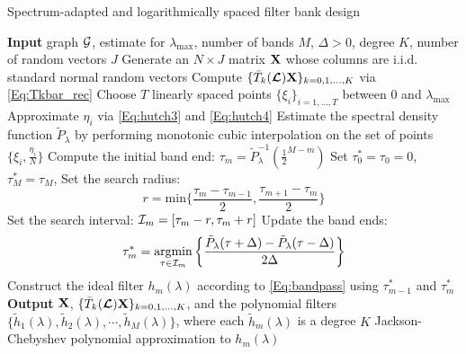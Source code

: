 \documentclass[journal, 10pt]{IEEEtran}
\begin{document}
\begin{algorithm}[tb]
\caption{Spectrum-adapted and logarithmically spaced filter bank design}
\begin{algorithmic}
\State \textbf{Input} graph ${\mathcal{G}}$, estimate for $\lambda_{\max}$, number of bands $M$, $\Delta>0$, degree $K$, number of random vectors $J$
\State Generate an $N \times J$ matrix $\bf{X}$  whose columns are i.i.d. standard normal random vectors
\State Compute $\{\bar{T}_k(\boldsymbol{\mathcal{L}}){\bf X}\}_{k=0,1,\ldots,K}$  via \eqref{Eq:Tkbar_rec}%
\State Choose $T$ linearly spaced points $\{\xi_i\}_{i=1,\ldots,T}$ between 0 and $\lambda_{\max}$
\State Approximate $\eta_{i}$ via \eqref{Eq:hutch3} and \eqref{Eq:hutch4} %
\EndFor
\State Estimate the spectral density function $\tilde{P}_{\lambda}$ by performing monotonic cubic interpolation on the set of points $\{\xi_i, \frac{\eta_i}{N} \}$ 
\State Compute the initial band end: $\tau_m = \tilde{P}_{\lambda}^{-1}(\frac{1}{2}^{M-m})$
\EndFor
\State Set $\tau_0^* = \tau_0 = 0$, $\tau_M^* = \tau_M$, 
\State Set the search radius: $$r = \text{min} \{\frac{\tau_m-\tau_{m-1}}{2}, \frac{\tau_{m+1}-\tau_m}{2}\}$$
\State Set the search interval: ${\cal I}_m = [\tau_m-r, \tau_m+r]$
\State Update the band ends: $$\tau_m^* = \underset{\tau \in {\cal I}_m}{\text{argmin}} \left\{\frac{\tilde{P}_{\lambda}(\tau+\Delta)-\tilde{P}_{\lambda}(\tau-\Delta)}{2\Delta}\right\}$$
\EndFor
{}
\State Construct the ideal filter $h_m(\lambda)$ according to \eqref{Eq:bandpass} using $\tau_{m-1}^*$ and $\tau_m^*$%
\EndFor
\State \textbf{Output} $\bf{X}$, $\{\bar{T}_k(\boldsymbol{\mathcal{L}}){\bf X}\}_{k=0,1,\ldots,K}$, and the
polynomial filters $\{ \tilde{h}_1(\lambda), \tilde{h}_2(\lambda), \cdots, \tilde{h}_M(\lambda)\}$, where each $\tilde{h}_m(\lambda)$ is a degree $K$ Jackson-Chebyshev polynomial approximation to  $h_m(\lambda)$ %
\end{algorithmic}
\label{Al:filter_bank}
\end{algorithm}
\end{document}
